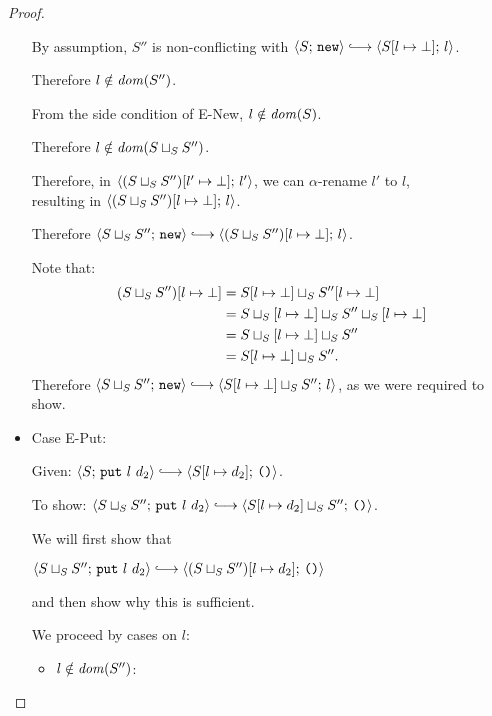 \begin{proof}
\begin{itemize}
      By assumption, $S''$ is non-conflicting with $\config{S}{\NEW}
      \parstepsto \config{\extSRaw{S}{l}{\bot}}{l}$.
 
      Therefore $l \notin \mathit{dom}(S'')$.

      From the side condition of {\sc E-New}, $l \notin \mathit{dom}(S)$.

      Therefore $l \notin \mathit{dom}(S \sqcup_{S} S'')$.

      Therefore, in
      $\langle (S \sqcup_{S} S'')[l' \mapsto \bot];\, l' \rangle$, we can
      $\alpha$-rename $l'$ to $l$, \\ resulting in
      $\langle (S \sqcup_{S} S'')[l \mapsto \bot];\, l \rangle$.

      Therefore $\config{\lubstore{S}{S''}}{\NEW} \parstepsto
      \config{\extSRaw{(\lubstore{S}{S''})}{l}{\bot}}{l}$.

      Note that:
      \begin{align*}
        (S \sqcup_{S} S'')[l \mapsto \bot] &=
        S[l \mapsto \bot] \sqcup_{S} S''[l \mapsto \bot] \\ &=
        S \sqcup_{S} \left[ l \mapsto \bot \right] \sqcup_{S} S'' \sqcup_{S} \left[ l \mapsto \bot \right]
        \\ &=
        S \sqcup_{S} \left[ l \mapsto \bot \right] \sqcup_{S} S''
        \\ &= S[l \mapsto \bot] \sqcup_{S} S''.
      \end{align*}
      Therefore $\config{\lubstore{S}{S''}}{\NEW} \parstepsto
      \config{\lubstore{\extSRaw{S}{l}{\bot}}{S''}}{l}$, as we were
      required to show.

    \item Case {\sc E-Put}:

      Given: $\config{S}{\putexp{l}{d_2}} \parstepsto
      \config{\extSRaw{S}{l}{d_2}}{\unit}$.

      To show: $\config{\lubstore{S}{S''}}{\putexp{l}{d_2}}
      \parstepsto
      \config{\lubstore{\extSRaw{S}{l}{d_2}}{S''}}{\unit}$.

      We will first show that

      $\config{\lubstore{S}{S''}}{\putexp{l}{d_2}} \parstepsto
      \config{\extSRaw{(\lubstore{S}{S''})}{l}{d_2}}{\unit}$

      and then show why this is sufficient.

      We proceed by cases on $l$:

      \begin{itemize}
        \item $l \notin \mathit{dom}(S'')$:


\end{itemize}
\end{itemize}
\end{proof}
